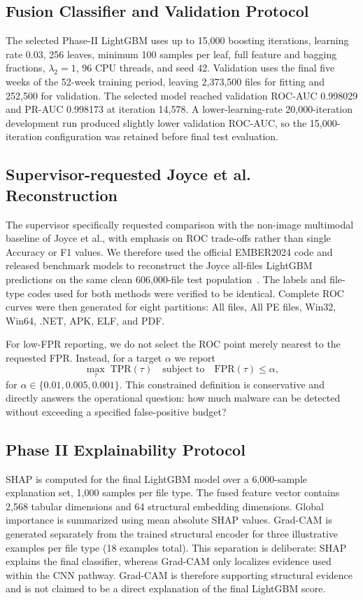 \documentclass[conference]{IEEEtran}
\begin{document}
\subsection{Fusion Classifier and Validation Protocol}
The selected Phase-II LightGBM uses up to 15,000 boosting iterations, learning rate 0.03, 256 leaves, minimum 100 samples per leaf, full feature and bagging fractions, $\lambda_2=1$, 96 CPU threads, and seed 42. Validation uses the final five weeks of the 52-week training period, leaving 2,373,500 files for fitting and 252,500 for validation. The selected model reached validation ROC-AUC 0.998029 and PR-AUC 0.998173 at iteration 14,578. A lower-learning-rate 20,000-iteration development run produced slightly lower validation ROC-AUC, so the 15,000-iteration configuration was retained before final test evaluation.

\subsection{Supervisor-requested Joyce et al. Reconstruction}
The supervisor specifically requested comparison with the non-image multimodal baseline of Joyce et al., with emphasis on ROC trade-offs rather than single Accuracy or F1 values. We therefore used the official EMBER2024 code and released benchmark models to reconstruct the Joyce all-files LightGBM predictions on the same clean 606,000-file test population~\cite{JMGPR2024,ember2024github}. The labels and file-type codes used for both methods were verified to be identical. Complete ROC curves were then generated for eight partitions: All files, All PE files, Win32, Win64, .NET, APK, ELF, and PDF.

For low-FPR reporting, we do not select the ROC point merely nearest to the requested FPR. Instead, for a target $\alpha$ we report
\begin{equation}
\max_{\tau}\;\mathrm{TPR}(\tau) \quad \text{subject to}\quad \mathrm{FPR}(\tau)\leq\alpha,
\end{equation}
for $\alpha\in\{0.01,0.005,0.001\}$. This constrained definition is conservative and directly answers the operational question: how much malware can be detected without exceeding a specified false-positive budget?

\subsection{Phase II Explainability Protocol}
SHAP is computed for the final LightGBM model over a 6,000-sample explanation set, 1,000 samples per file type. The fused feature vector contains 2,568 tabular dimensions and 64 structural embedding dimensions. Global importance is summarized using mean absolute SHAP values. Grad-CAM is generated separately from the trained structural encoder for three illustrative examples per file type (18 examples total). This separation is deliberate: SHAP explains the final classifier, whereas Grad-CAM only localizes evidence used within the CNN pathway. Grad-CAM is therefore supporting structural evidence and is not claimed to be a direct explanation of the final LightGBM score.
\end{document}
